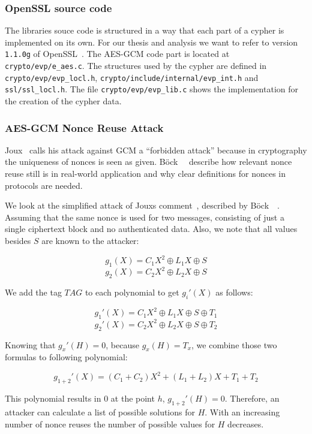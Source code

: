 \subsubsection{OpenSSL source code}

The libraries souce code is structured in a way that each part of a
cypher is implemented on its own. For our thesis and analysis we want to
refer to version \texttt{1.1.0g} of OpenSSL~\cite{opensslsource}. The AES-GCM
code part is located at \texttt{crypto/evp/e\_aes.c}. The structures used by the
cypher are defined in \texttt{crypto/evp/evp\_locl.h},
\texttt{crypto/include/internal/evp\_int.h} and \texttt{ssl/ssl\_locl.h}. The
file \texttt{crypto/evp/evp\_lib.c} shows the implementation for the creation of
the cypher data.

\subsubsection{AES-GCM Nonce Reuse Attack}

Joux~\cite{NISTGCMcomment} calls his attack against GCM a ``forbidden attack''
because in cryptography the uniqueness of nonces is seen as given.
Böck~\etal~\cite{gcmnonceattack} describe how relevant nonce reuse still is in
real-world application and why clear definitions for nonces in protocols are
needed. 

We look at the simplified attack of Joux\textquotesingle s
comment~\cite{NISTGCMcomment}, described by Böck~\etal~\cite{gcmnonceattack}.
Assuming that the same nonce is used for two messages, consisting of just a
single ciphertext block and no authenticated data. Also, we note that all
values besides $S$ are known to the attacker:

\[g_1(X) = C{_{1}X^2 \oplus L_1X \oplus S}\]
\[g_2(X) = C{_{2}X^2 \oplus L_2X \oplus S}\]

We add the tag $TAG$ to each polynomial to get $g_i'(X)$ as follows:

\[g_1'(X) = C{_{1}X^2 \oplus L_1X \oplus S \oplus T_1}\]
\[g_2'(X) = C{_{2}X^2 \oplus L_2X \oplus S \oplus T_2}\]

Knowing that $g_x'(H) = 0$, because $g_x(H) = T_x$, we combine those two
formulas to following polynomial:

\[g_{1+2}'(X) = (C_{1} + C_{2})X^2 + (L_1 + L_2)X + T_1 + T_2\]

This polynomial results in $0$ at the point $h$, $g_{1+2}'(H) = 0$.
Therefore, an attacker can calculate a list of possible solutions for $H$.
With an increasing number of nonce reuses the number of possible values for $H$
decreases.

